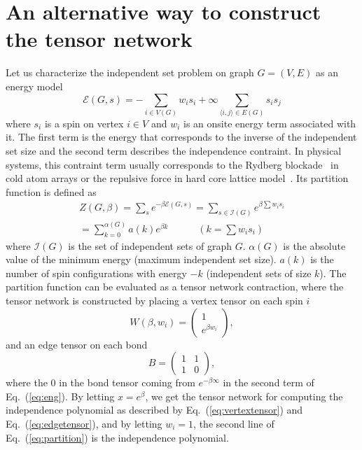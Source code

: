 \documentclass[onefignum, onetabnum]{siamart190516}
\newcommand{\<}{\langle}
\renewcommand{\>}{\rangle}
\newcommand{\Eq}[1]{Eq.~(\ref{#1})}
\begin{document}



\appendix

\section{An alternative way to construct the tensor network}\label{sec:energymodel}

Let us characterize the independent set problem on graph $G=(V, E)$ as an energy model
\begin{equation}\label{eq:eng}
    \mathcal{E}(G, s) = -\sum_{i\in V(G)} w_i s_i + \infty \sum_{\langle i,j\rangle \in E(G)}s_i s_j
\end{equation}
where $s_i$ is a spin on vertex $i \in V$ and $w_i$ is an onsite energy term associated with it.
The first term is the energy that corresponds to the inverse of the independent set size and the second term describes the independence contraint.
In physical systems, this contraint term usually corresponds to the Rydberg blockade~\cite{Pichler2018, Ebadi2022} in cold atom arrays or the repulsive force in hard core lattice model~\cite{Dyre2016, Fernandes2007}.
Its partition function is defined as
\begin{equation}\label{eq:partition}
    \begin{split}
    Z(G, \beta) = \sum_{s}e^{-\beta \mathcal{E}(G, s)} = \sum_{s\in \mathcal{I}(G)} e^{\beta \sum w_i s_i}\\
         = \sum_{k=0}^{\alpha(G)}a(k) e^{\beta k}  \qquad \quad (k = \sum w_i s_i)
    \end{split}
\end{equation}
where $\mathcal{I}(G)$ is the set of independent sets of graph $G$.
$\alpha(G)$ is the absolute value of the minimum energy (maximum independent set size).
$a(k)$ is the number of spin configurations with energy $-k$ (independent sets of size $k$).
The partition function can be evaluated as a tensor network contraction,
where the tensor network is constructed by placing a vertex tensor on each spin $i$
\begin{equation}
    W(\beta, w_i) = \left(\begin{matrix}
        1 \\
        e^{\beta w_i}
    \end{matrix}\right),
\end{equation}
and an edge tensor on each bond
\begin{equation}
       B = \left(\begin{matrix}
        1  & 1\\
        1 & 0
    \end{matrix}\right),
\end{equation}
where the $0$ in the bond tensor coming from $e^{-\beta\infty}$ in the second term of \Eq{eq:eng}.
By letting $x = e^{\beta}$, we get the tensor network for computing the independence polynomial as described by \Eq{eq:vertextensor} and \Eq{eq:edgetensor},
and by letting $w_i=1$, the second line of \Eq{eq:partition} is the independence polynomial.
\end{document}

